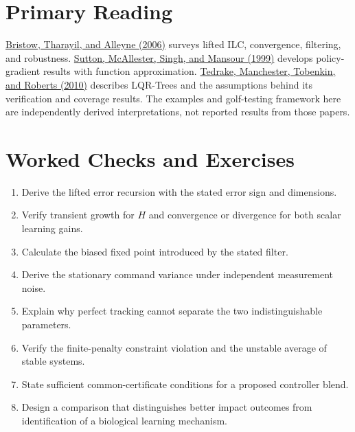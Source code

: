 \begin{samepage}
\section{Primary Reading}

\href{https://www.diag.uniroma1.it/~deluca/rob2_en/A_survey_of_iterative_learning_control_CSMag_2006.pdf}{Bristow, Tharayil, and Alleyne (2006)} surveys lifted ILC, convergence, filtering, and robustness.
\href{https://proceedings.neurips.cc/paper/1999/file/464d828b85b0bed98e80ade0a5c43b0f-Paper.pdf}{Sutton, McAllester, Singh, and Mansour (1999)} develops policy-gradient results with function approximation.
\href{https://groups.csail.mit.edu/robotics-center/public_papers/Tedrake10.pdf}{Tedrake, Manchester, Tobenkin, and Roberts (2010)} describes LQR-Trees and the assumptions behind its verification and coverage results.
The examples and golf-testing framework here are independently derived interpretations, not reported results from those papers.

\section{Worked Checks and Exercises}

\begin{enumerate}[itemsep=0.25em,parsep=0pt]
\item Derive the lifted error recursion with the stated error sign and dimensions.
\item Verify transient growth for $H$ and convergence or divergence for both scalar learning gains.
\item Calculate the biased fixed point introduced by the stated filter.
\item Derive the stationary command variance under independent measurement noise.
\item Explain why perfect tracking cannot separate the two indistinguishable parameters.
\item Verify the finite-penalty constraint violation and the unstable average of stable systems.
\item State sufficient common-certificate conditions for a proposed controller blend.
\item Design a comparison that distinguishes better impact outcomes from identification of a biological learning mechanism.
\end{enumerate}
\end{samepage}
\clearpage
\endgroup
